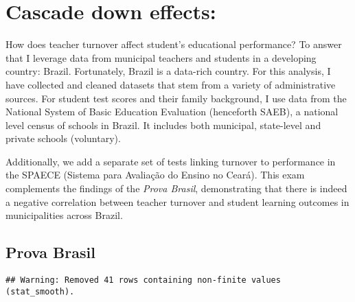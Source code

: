 \documentclass[12pt,]{book}
\newenvironment{Shaded}{\begin{snugshade}}{\end{snugshade}}
\newcommand{\DataTypeTok}[1]{\textcolor[rgb]{0.13,0.29,0.53}{#1}}
\newcommand{\DecValTok}[1]{\textcolor[rgb]{0.00,0.00,0.81}{#1}}
\newcommand{\KeywordTok}[1]{\textcolor[rgb]{0.13,0.29,0.53}{\textbf{#1}}}
\newcommand{\NormalTok}[1]{#1}
\newcommand{\OperatorTok}[1]{\textcolor[rgb]{0.81,0.36,0.00}{\textbf{#1}}}
\newcommand{\StringTok}[1]{\textcolor[rgb]{0.31,0.60,0.02}{#1}}
\begin{document}
\hypertarget{cascade-down-effects}{%
\chapter{Cascade down effects:}\label{cascade-down-effects}}

How does teacher turnover affect student's educational performance? To answer that I leverage data from municipal teachers and students in a developing country: Brazil. Fortunately, Brazil is a data-rich country. For this analysis, I have collected and cleaned datasets that stem from a variety of administrative sources. For student test scores and their family background, I use data from the National System of Basic Education Evaluation (henceforth SAEB), a national level census of schools in Brazil. It includes both municipal, state-level and private schools (voluntary).

Additionally, we add a separate set of tests linking turnover to performance in the SPAECE (Sistema para Avaliação do Ensino no Ceará). This exam complements the findings of the \textit{Prova Brasil}, demonstrating that there is indeed a negative correlation between teacher turnover and student learning outcomes in municipalities across Brazil.

\hypertarget{prova-brasil}{%
\section{Prova Brasil}\label{prova-brasil}}

\begin{Shaded}
\end{Shaded}

\begin{verbatim}
## Warning: Removed 41 rows containing non-finite values (stat_smooth).
\end{verbatim}
\end{document}
